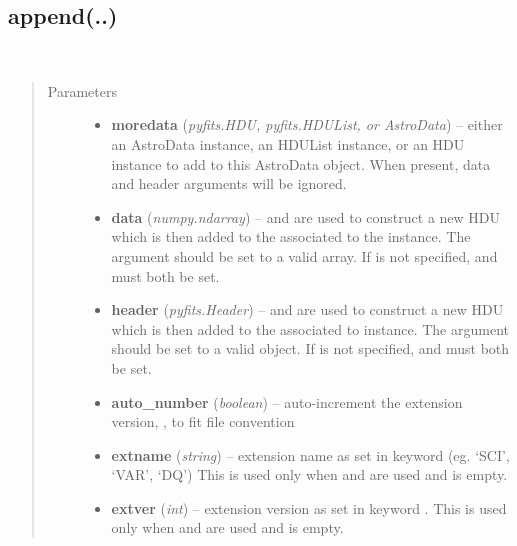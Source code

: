 \documentclass[letterpaper,10pt,english]{sphinxmanual}
\begin{document}
\subsection{append(..)}
\label{chapter_AstroDataClass:append}

\begin{fulllineitems}
\label{chapter_AstroDataClass:astrodata.data.AstroData.append}~\begin{quote}\begin{description}
\item[{Parameters}] \leavevmode\begin{itemize}
\item {} 
\textbf{moredata} (\emph{pyfits.HDU, pyfits.HDUList, or AstroData}) -- either an AstroData instance, an HDUList instance, 
or an HDU instance to add to this AstroData object.
When present, data and header arguments will be ignored.

\item {} 
\textbf{data} (\emph{numpy.ndarray}) --  and  are used to construct a new HDU which is then 
added to the  associated to the  instance. The  
argument should be set
to a valid  array. If  is not specified,  and 
must both be set.

\item {} 
\textbf{header} (\emph{pyfits.Header}) --  and  are used
to construct a new HDU which is then added to the  associated to 
 instance. The  argument should be set to a
valid  object. If  is not specified,  and
 must both be set.

\item {} 
\textbf{auto\_number} (\emph{boolean}) -- auto-increment the extension version, , to fit file convention

\item {} 
\textbf{extname} (\emph{string}) -- extension name as set in keyword  (eg. `SCI', `VAR', `DQ')
This is used only when  and  are used and  is
empty.

\item {} 
\textbf{extver} (\emph{int}) -- extension version as set in keyword .
This is used only when  and  are used and  is
empty.


\end{itemize}
\end{description}
\end{quote}
\end{fulllineitems}
\end{document}
